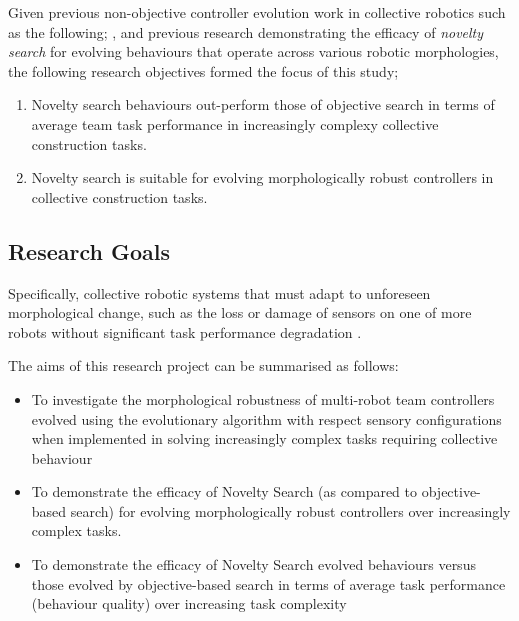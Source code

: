 

Given previous non-objective controller evolution work in collective robotics such as the following;
\cite{gomes2013generic}
\cite{RefWorks:5}
\cite{RefWorks:11},
and previous research demonstrating the efficacy of \textit{novelty search} \cite{lehman2011abandoning} for evolving behaviours that operate across various robotic morphologies, the following research objectives formed the focus of this study;

\begin{enumerate}
	\item Novelty search behaviours out-perform those of objective search in terms of average team task performance in increasingly complexy collective construction tasks.
	\item Novelty search is suitable for evolving morphologically robust controllers in collective construction tasks.
\end{enumerate}




\subsection{Research Goals}

Specifically, collective robotic systems that must adapt to unforeseen morphological change, such as the loss or damage of sensors on one of more robots without significant task performance degradation \cite{BongardZykovLipson2006} \cite{CullyCluneTaraporeMouret2015}.

The aims of this research project can be summarised as follows:
\begin{itemize}
	\item To investigate the morphological robustness of multi-robot team controllers evolved using the evolutionary algorithm with respect sensory configurations when implemented in solving increasingly complex tasks requiring collective behaviour
	\item To demonstrate the efficacy of Novelty Search (as compared to objective-based search) for evolving morphologically robust controllers over increasingly complex tasks.
	\item To demonstrate the efficacy of Novelty Search evolved behaviours versus those evolved by objective-based search in terms of average task performance (behaviour quality) over increasing task complexity
\end{itemize}

